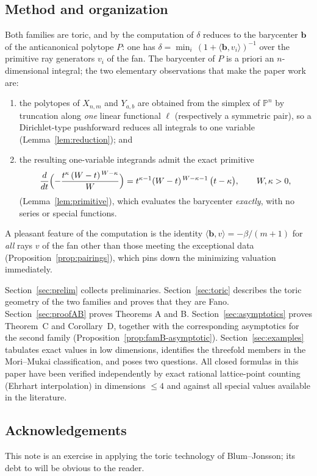 \documentclass[11pt]{amsart}
\theoremstyle{definition}
\theoremstyle{remark}
\newcommand{\PP}{\mathbb{P}}
\begin{document}
\subsection*{Method and organization}
Both families are toric, and by \cite[\S 7]{BJ20} the computation of
$\delta$ reduces to the barycenter $\mathbf b$ of the anticanonical
polytope $P$: one has
$\delta=\min_i\,(1+\langle\mathbf b,v_i\rangle)^{-1}$ over the primitive
ray generators $v_i$ of the fan. The barycenter of $P$ is a priori an
$n$-dimensional integral; the two elementary observations that make the
paper work are:
\begin{enumerate}[label=(\alph*)]
\item the polytopes of $X_{n,m}$ and $Y_{a,b}$ are obtained from the
simplex of $\PP^n$ by truncation along \emph{one} linear functional
$\ell$ (respectively a symmetric pair), so a Dirichlet-type pushforward
reduces all integrals to one variable
(Lemma~\ref{lem:reduction}); and
\item the resulting one-variable integrands admit the exact primitive
\[
\frac{d}{dt}\Bigl(-\frac{t^{\kappa}\,(W-t)^{\,W-\kappa}}{W}\Bigr)
= t^{\kappa-1}(W-t)^{\,W-\kappa-1}\,\bigl(t-\kappa\bigr),
\qquad W,\kappa>0,
\]
(Lemma~\ref{lem:primitive}), which evaluates the barycenter
\emph{exactly}, with no series or special functions.
\end{enumerate}
A pleasant feature of the computation is the identity
$\langle\mathbf b,v\rangle=-\beta/(m+1)$ for \emph{all} rays $v$ of the
fan other than those meeting the exceptional data
(Proposition~\ref{prop:pairings}), which pins down the minimizing
valuation immediately.

Section~\ref{sec:prelim} collects preliminaries.
Section~\ref{sec:toric} describes the toric geometry of the two
families and proves that they are Fano. Section~\ref{sec:proofAB}
proves Theorems A and B. Section~\ref{sec:asymptotics} proves
Theorem~C and Corollary~D, together with the corresponding asymptotics
for the second family (Proposition~\ref{prop:famB-asymptotic}).
Section~\ref{sec:examples} tabulates exact values in low dimensions,
identifies the threefold members in the Mori--Mukai classification, and
poses two questions. All closed formulas in this paper have been
verified independently by exact rational lattice-point counting
(Ehrhart interpolation) in dimensions $\le 4$ and against all special
values available in the literature.

\subsection*{Acknowledgements}
This note is an exercise in applying the toric technology of
Blum--Jonsson; its debt to \cite{BJ20,ZZ21,Delcroix22,BMY24} will be
obvious to the reader.
\end{document}
